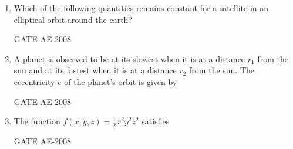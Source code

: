 \documentclass[journal,12pt,onecolumn]{IEEEtran}
\theoremstyle{remark}
\begin{document}
\begin{enumerate}
\quad


\quad 

        \item Which of the following quantities remains constant for a satellite in an elliptical orbit around the earth?\\
    \begin{enumerate}
    \end{enumerate}
\hfill{GATE AE-2008}

    \quad
    
    \item A planet is observed to be at its slowest when it is at a distance $r_1$ from the sun and at its fastest when it is at a distance $r_2$ from the sun. The eccentricity $e$ of the planet's orbit is given by\\
    \begin{enumerate}
    \end{enumerate}
    \hfill{GATE AE-2008}

\quad

    \item The function $f(x,y,z) = \frac{1}{2}x^2y^2z^2$ satisfies\\
    \begin{enumerate}
    \end{enumerate}
    \hfill{GATE AE-2008}


\end{enumerate}
\end{document}

